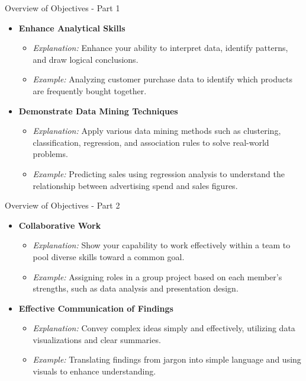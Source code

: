 \documentclass[aspectratio=169]{beamer}
\begin{document}
\begin{frame}[fragile]{Overview of Objectives - Part 1}
  \begin{itemize}
    \item \textbf{Enhance Analytical Skills}

      \begin{itemize}
        \item \textit{Explanation:} Enhance your ability to interpret data, identify patterns, and draw logical conclusions. 
        \item \textit{Example:} Analyzing customer purchase data to identify which products are frequently bought together.
      \end{itemize}
      
    \item \textbf{Demonstrate Data Mining Techniques}
    
      \begin{itemize}
        \item \textit{Explanation:} Apply various data mining methods such as clustering, classification, regression, and association rules to solve real-world problems.
        \item \textit{Example:} Predicting sales using regression analysis to understand the relationship between advertising spend and sales figures.
      \end{itemize}
  \end{itemize}
\end{frame}

\begin{frame}[fragile]{Overview of Objectives - Part 2}
  \begin{itemize}
    \item \textbf{Collaborative Work}

      \begin{itemize}
        \item \textit{Explanation:} Show your capability to work effectively within a team to pool diverse skills toward a common goal.
        \item \textit{Example:} Assigning roles in a group project based on each member's strengths, such as data analysis and presentation design.
      \end{itemize}

    \item \textbf{Effective Communication of Findings}
    
      \begin{itemize}
        \item \textit{Explanation:} Convey complex ideas simply and effectively, utilizing data visualizations and clear summaries.
        \item \textit{Example:} Translating findings from jargon into simple language and using visuals to enhance understanding.
      \end{itemize}
  \end{itemize}
\end{frame}
\end{document}
